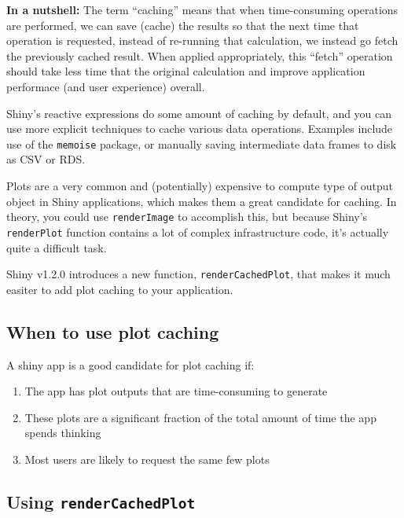 \documentclass[]{book}
\providecommand{\tightlist}{%
  \setlength{\itemsep}{0pt}\setlength{\parskip}{0pt}}
\theoremstyle{definition}
\theoremstyle{definition}
\theoremstyle{definition}
\theoremstyle{remark}
\begin{document}
\textbf{In a nutshell:} The term ``caching'' means that when
time-consuming operations are performed, we can save (cache) the results
so that the next time that operation is requested, instead of re-running
that calculation, we instead go fetch the previously cached result. When
applied appropriately, this ``fetch'' operation should take less time
that the original calculation and improve application performace (and
user experience) overall.

Shiny's reactive expressions do some amount of caching by default, and
you can use more explicit techniques to cache various data operations.
Examples include use of the \texttt{memoise} package, or manually saving
intermediate data frames to disk as CSV or RDS.

Plots are a very common and (potentially) expensive to compute type of
output object in Shiny applications, which makes them a great candidate
for caching. In theory, you could use \texttt{renderImage} to accomplish
this, but because Shiny's \texttt{renderPlot} function contains a lot of
complex infrastructure code, it's actually quite a difficult task.

Shiny v1.2.0 introduces a new function, \texttt{renderCachedPlot}, that
makes it much easiter to add plot caching to your application.

\hypertarget{when-to-use-plot-caching}{%
\subsection{When to use plot caching}\label{when-to-use-plot-caching}}

A shiny app is a good candidate for plot caching if:

\begin{enumerate}
\def\labelenumi{\arabic{enumi}.}
\tightlist
\item
  The app has plot outputs that are time-consuming to generate
\item
  These plots are a significant fraction of the total amount of time the
  app spends thinking
\item
  Most users are likely to request the same few plots
\end{enumerate}

\hypertarget{using-rendercachedplot}{%
\subsection{\texorpdfstring{Using
\texttt{renderCachedPlot}}{Using renderCachedPlot}}\label{using-rendercachedplot}}
\end{document}
